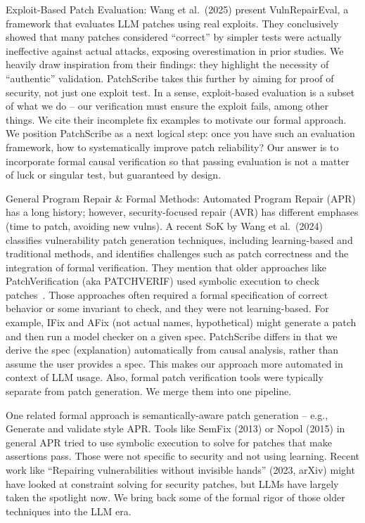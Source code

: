 \documentclass[conference,compsoc]{IEEEtran}
\begin{document}
Exploit-Based Patch Evaluation: Wang et al.~(2025) present
VulnRepairEval, a framework that evaluates LLM patches using real
exploits. They conclusively showed that many patches considered
``correct'' by simpler tests were actually ineffective against actual
attacks, exposing overestimation in prior studies. We heavily draw
inspiration from their findings: they highlight the necessity of
``authentic'' validation. PatchScribe takes this further by aiming for
proof of security, not just one exploit test. In a sense, exploit-based
evaluation is a subset of what we do -- our verification must ensure the
exploit fails, among other things. We cite their incomplete fix examples
to motivate our formal approach. We position PatchScribe as a next
logical step: once you have such an evaluation framework, how to
systematically improve patch reliability? Our answer is to incorporate
formal causal verification so that passing evaluation is not a matter of
luck or singular test, but guaranteed by design.

General Program Repair \& Formal Methods: Automated Program Repair (APR)
has a long history; however, security-focused repair (AVR) has different
emphases (time to patch, avoiding new vulns). A recent SoK by Wang et
al.~(2024) classifies vulnerability patch generation techniques,
including learning-based and traditional methods, and identifies
challenges such as patch correctness and the integration of formal
verification. They mention that older approaches like PatchVerification
(aka PATCHVERIF) used symbolic execution to check patches~\cite{wang2023patchverif}. Those
approaches often required a formal specification of correct behavior or
some invariant to check, and they were not learning-based. For example,
IFix and AFix (not actual names, hypothetical) might generate a patch
and then run a model checker on a given spec. PatchScribe differs in
that we derive the spec (explanation) automatically from causal
analysis, rather than assume the user provides a spec. This makes our
approach more automated in context of LLM usage. Also, formal patch
verification tools were typically separate from patch generation. We
merge them into one pipeline.

One related formal approach is semantically-aware patch generation --
e.g., Generate and validate style APR. Tools like SemFix (2013) or Nopol
(2015) in general APR tried to use symbolic execution to solve for
patches that make assertions pass. Those were not specific to security
and not using learning. Recent work like ``Repairing vulnerabilities
without invisible hands'' (2023, arXiv) might have looked at constraint
solving for security patches, but LLMs have largely taken the spotlight
now. We bring back some of the formal rigor of those older techniques
into the LLM era.
\end{document}
